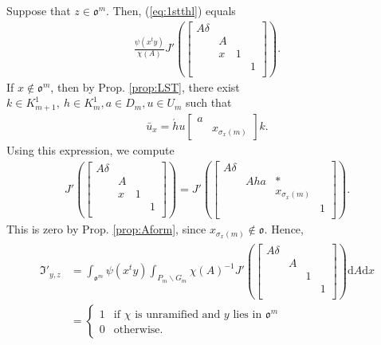 \documentclass[11pt]{amsart}
\newcommand\s{\sigma}%
\newcommand\oo{\mathfrak{o}}
\newcommand\If{\mathfrak{I}}
\newcommand\dr{\mathrm{d}}
\newcommand\1{\mathbf{1}}
\newcommand\ac{\acute}
\newcommand\bs{\backslash}%
\newcommand\bu{\bar{u}}
\numberwithin{equation}{section}
\begin{document}
Suppose that $z \in \oo^m$.
Then, (\ref{eq:1stthl}) equals
\begin{align*}
\frac{\psi(x{}^ty)}{\chi(A)} J'(\begin{bmatrix}
A\delta & & &  \\
& A& & \\
& x & 1  &  \\
& & &1  \\
\end{bmatrix}).
\end{align*} 
If $x \not\in \oo^m$, then by Prop. \ref{prop:LST}, there exist $k \in K_{m+1}^1, \ h \in K_{m}^1, a \in D_{m}, u \in U_m$ such that 
\begin{align*}
\bu_x = \ac{h} u \begin{bmatrix}
a &  \\
& x_{\s_x(m)}
\end{bmatrix}k.
\end{align*}
Using this expression, we compute 
\begin{align*}
J'(\begin{bmatrix}
A\delta & & &  \\
& A& & \\
& x & 1  &  \\
& & &1  \\
\end{bmatrix}) = J'(\begin{bmatrix}
A\delta & & &  \\
& A h a& *& \\
& & x_{\s_x(m)} &  \\
& & &1  \\
\end{bmatrix}).
\end{align*} 
This is zero by Prop. \ref{prop:Aform}, since $x_{\s_x(m)} \not\in \oo$.
Hence, 
\begin{align}
\begin{split}
\If'_{y,z} &=\int_{\oo^m} \psi(x{}^ty) \int_{P_m\bs G_m }\chi(A)^{-1} J'(\begin{bmatrix}
A\delta & & &  \\
& A& & \\
& & 1  &  \\
& & &1  \\
\end{bmatrix}) \dr A \dr x \\
&= 
\begin{cases}
1 & \mbox{if $\chi$ is unramified and $y$ lies in $\oo^m$} \\
0 & \mbox{otherwise.} 
\end{cases}
\end{split}\label{eq:Ifyz}
\end{align} 
\end{document}

